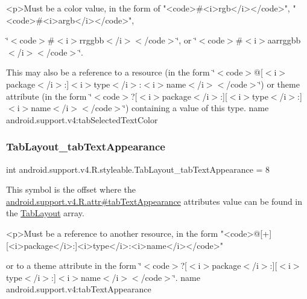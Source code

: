 \begin{DoxyVerb}      <p>Must be a color value, in the form of "<code>#<i>rgb</i></code>", "<code>#<i>argb</i></code>",
\end{DoxyVerb}
 \char`\"{}$<$code$>$\#$<$i$>$rrggbb$<$/i$>$$<$/code$>$\char`\"{}, or \char`\"{}$<$code$>$\#$<$i$>$aarrggbb$<$/i$>$$<$/code$>$\char`\"{}. 

This may also be a reference to a resource (in the form \char`\"{}$<$code$>$@\mbox{[}$<$i$>$package$<$/i$>$\+:\mbox{]}$<$i$>$type$<$/i$>$\+:$<$i$>$name$<$/i$>$$<$/code$>$\char`\"{}) or theme attribute (in the form \char`\"{}$<$code$>$?\mbox{[}$<$i$>$package$<$/i$>$\+:\mbox{]}\mbox{[}$<$i$>$type$<$/i$>$\+:\mbox{]}$<$i$>$name$<$/i$>$$<$/code$>$\char`\"{}) containing a value of this type.  name android.\+support.\+v4\+:tab\+Selected\+Text\+Color \mbox{\label{classandroid_1_1support_1_1v4_1_1R_1_1styleable_aeacf242f27f0a2963e574087838a660b}} 
\subsubsection{\texorpdfstring{Tab\+Layout\+\_\+tab\+Text\+Appearance}{TabLayout\_tabTextAppearance}}
{\footnotesize\ttfamily int android.\+support.\+v4.\+R.\+styleable.\+Tab\+Layout\+\_\+tab\+Text\+Appearance = 8\hspace{0.3cm}{\ttfamily [static]}}

This symbol is the offset where the \hyperlink{classandroid_1_1support_1_1v4_1_1R_1_1attr_a24a6389980f226da2272d93c69206a1a}{android.\+support.\+v4.\+R.\+attr\#tab\+Text\+Appearance} attribute\textquotesingle{}s value can be found in the \hyperlink{classandroid_1_1support_1_1v4_1_1R_1_1styleable_a48e866d7121b40ef0bb3d467759606a9}{Tab\+Layout} array.

\begin{DoxyVerb}      <p>Must be a reference to another resource, in the form "<code>@[+][<i>package</i>:]<i>type</i>:<i>name</i></code>"
\end{DoxyVerb}
 or to a theme attribute in the form \char`\"{}$<$code$>$?\mbox{[}$<$i$>$package$<$/i$>$\+:\mbox{]}\mbox{[}$<$i$>$type$<$/i$>$\+:\mbox{]}$<$i$>$name$<$/i$>$$<$/code$>$\char`\"{}.  name android.\+support.\+v4\+:tab\+Text\+Appearance \mbox{\label{classandroid_1_1support_1_1v4_1_1R_1_1styleable_a3325892a8a8af0369aea2f77e46cdda0}} 
